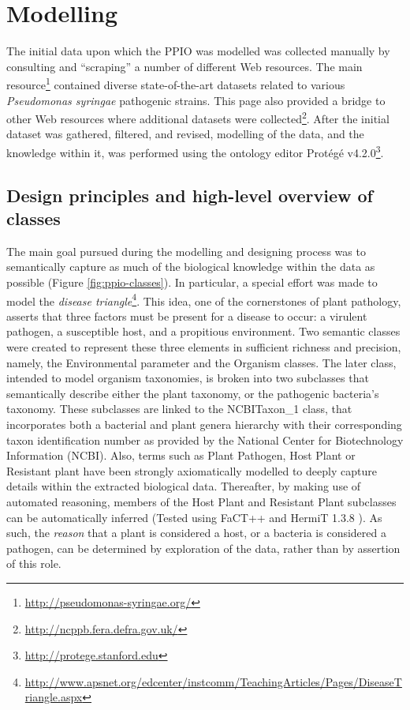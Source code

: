 \documentclass[sw]{iosart2c}
\newcommand{\myurl}[1]{\footnote{\url{#1}}}
\begin{document}
\section{Modelling}

The initial data upon which the PPIO was modelled was collected manually by consulting and ``scraping'' a number of different Web resources. The main resource\myurl{http://pseudomonas-syringae.org/} contained diverse state-of-the-art datasets related to various {\itshape Pseudomonas syringae} pathogenic strains. This page also provided a bridge to other Web resources where additional datasets were collected\myurl{http://ncppb.fera.defra.gov.uk/}. After the initial dataset was gathered, filtered, and revised, modelling of the data, and the knowledge within it, was performed using the ontology editor Prot\'eg\'e v4.2.0\myurl{http://protege.stanford.edu}.

\subsection{Design principles and high-level overview of classes}

The main goal pursued during the modelling and designing process was to semantically capture as much of the biological knowledge within the data as possible (Figure \ref{fig:ppio-classes}). In particular, a special effort was made to model the {\itshape disease triangle}\myurl{http://www.apsnet.org/edcenter/instcomm/TeachingArticles/Pages/DiseaseTriangle.aspx}. This idea, one of the cornerstones of plant pathology, asserts that three factors must be present for a disease to occur: a virulent pathogen, a susceptible host, and a propitious environment. Two semantic classes were created to represent these three elements in sufficient richness and precision, namely, the {\sf Environmental parameter} and the {\sf Organism} classes. The later class, intended to model organism taxonomies, is broken into two subclasses that semantically describe either the plant taxonomy, or the pathogenic bacteria's taxonomy. These subclasses are linked to the {\sf NCBITaxon\_1} class, that incorporates both a bacterial and plant genera hierarchy with their corresponding taxon identification number as provided by the National Center for Biotechnology Information (NCBI). Also, terms such as {\sf Plant Pathogen}, {\sf Host Plant} or {\sf Resistant plant} have been strongly axiomatically modelled to deeply capture details within the extracted biological data.  Thereafter, by making use of automated reasoning, members of the {\sf Host Plant} and {\sf Resistant Plant} subclasses can be automatically inferred (Tested using FaCT++ \cite{TsHo06a} and HermiT 1.3.8 \cite{hermit}). As such, the {\itshape reason} that a plant is considered a host, or a bacteria is considered a pathogen, can be determined by exploration of the data, rather than by assertion of this role.
\end{document}
